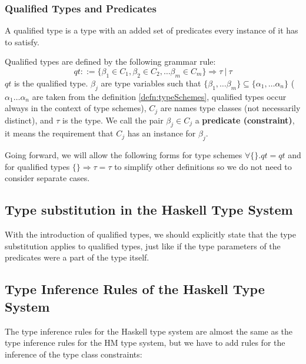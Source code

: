 \subsubsection{Qualified Types and Predicates}

A qualified type is a type with an added set of predicates every instance of it has to satisfy.

\begin{defn}
    Qualified types are defined by the following grammar rule:
    $$qt ::= \{\beta_1 \in C_1, \beta_2 \in C_2, \dots \beta_m \in C_m\} \Rightarrow \tau\ |\ \tau$$
    $qt$ is the qualified type. $\beta_j$ are type variables such that $\{\beta_1, \dots \beta_m\} \subseteq \{\alpha_1, \dots \alpha_n\}$ ($\alpha_1 \dots \alpha_n$ are taken from the definition \ref{defn:typeSchemes}, qualified types occur always in the context of type schemes), $C_j$ are names type classes (not necessarily distinct), and $\tau$ is the type. We call the pair $\beta_j \in C_j$ a \textbf{predicate (constraint)}, it means the requirement that $C_j$ has an instance for $\beta_j$.
\end{defn}

Going forward, we will allow the following forms for type schemes $\forall \{\}. qt = qt$ and for qualified types $\{\} \Rightarrow \tau = \tau$ to simplify other definitions so we do not need to consider separate cases.

\subsection{Type substitution in the Haskell Type System}

With the introduction of qualified types, we should explicitly state that the type substitution applies to qualified types, just like if the type parameters of the predicates were a part of the type itself.

\subsection{Type Inference Rules of the Haskell Type System}

The type inference rules for the Haskell type system are almost the same as the type inference rules for the HM type system, but we have to add rules for the inference of the type class constraints:

